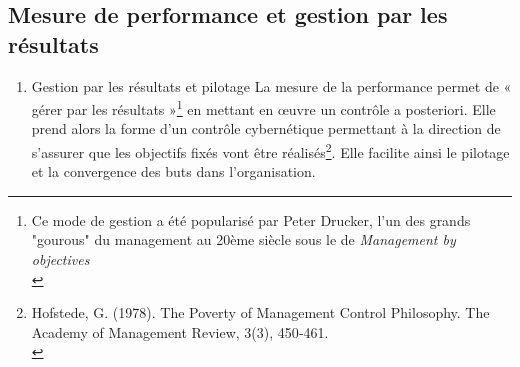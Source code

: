 \documentclass{tufte-handout}
\begin{document}
\subsection{Mesure de performance et gestion par les résultats}
\label{sec:org35762d1}
\begin{enumerate}
\item Gestion par les résultats et pilotage
\label{sec:org8ece126}
La mesure de la performance permet de « gérer par les résultats »\footnote{Ce mode de gestion a été popularisé par Peter Drucker, l'un des grands "gourous" du management au 20ème siècle sous le de \emph{Management by objectives}\\} en mettant en œuvre un contrôle a posteriori. Elle prend alors la forme d’un contrôle cybernétique permettant à la direction de s’assurer que les objectifs fixés vont être réalisés\footnote{Hofstede, G. (1978). The Poverty of Management Control Philosophy. The Academy of Management Review, 3(3), 450‑461.\\}. Elle facilite ainsi le pilotage et la convergence des buts dans l’organisation.\\


\end{enumerate}
\end{document}
